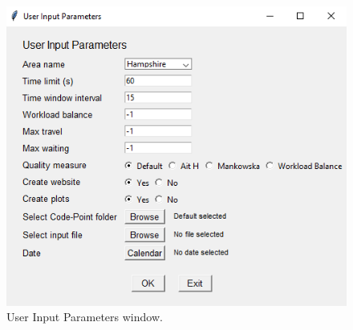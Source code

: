 \documentclass[a4paper]{article}
\begin{document}
\begin{figure}[H]
	\centering
	\includegraphics[width=0.72\linewidth]{figures/userinput}%
	\caption{User Input Parameters window.}
\end{figure}
\end{document}
